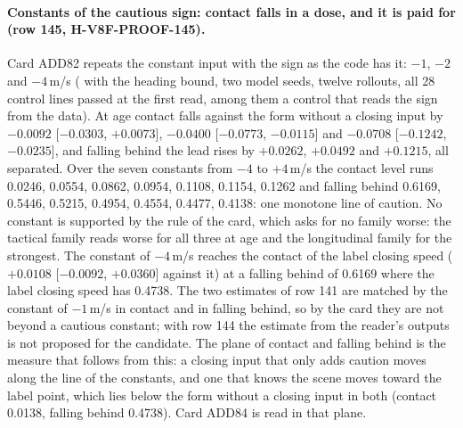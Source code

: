 \paragraph{Constants of the cautious sign: contact falls in a dose, and it is paid for (row 145, H-V8F-PROOF-145).} Card ADD82 repeats the constant input with the sign as the code has it: $-1$, $-2$ and $-4$\,m/s ( with the heading bound, two model seeds, twelve rollouts, all 28 control lines passed at the first read, among them a control that reads the sign from the data). At age contact falls against the form without a closing input by $-0.0092$ [$-0.0303$, $+0.0073$], $-0.0400$ [$-0.0773$, $-0.0115$] and $-0.0708$ [$-0.1242$, $-0.0235$], and falling behind the lead rises by $+0.0262$, $+0.0492$ and $+0.1215$, all separated. Over the seven constants from $-4$ to $+4$\,m/s the contact level runs 0.0246, 0.0554, 0.0862, 0.0954, 0.1108, 0.1154, 0.1262 and falling behind 0.6169, 0.5446, 0.5215, 0.4954, 0.4554, 0.4477, 0.4138: one monotone line of caution. No constant is supported by the rule of the card, which asks for no family worse: the tactical family reads worse for all three at age and the longitudinal family for the strongest. The constant of $-4$\,m/s reaches the contact of the label closing speed ($+0.0108$ [$-0.0092$, $+0.0360$] against it) at a falling behind of 0.6169 where the label closing speed has 0.4738. The two estimates of row 141 are matched by the constant of $-1$\,m/s in contact and in falling behind, so by the card they are not beyond a cautious constant; with row 144 the estimate from the reader's outputs is not proposed for the candidate. The plane of contact and falling behind is the measure that follows from this: a closing input that only adds caution moves along the line of the constants, and one that knows the scene moves toward the label point, which lies below the form without a closing input in both (contact 0.0138, falling behind 0.4738). Card ADD84 is read in that plane.


